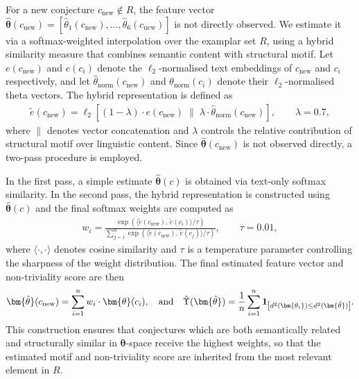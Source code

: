 \documentclass[11pt,reqno]{amsart}
\theoremstyle{plain}\newtheorem{theorem}{Theorem}[section]
\numberwithin{equation}{section}
\begin{document}
For a new conjecture $c_{\mathrm{new}}\notin R$, the feature vector $\bm{\hat{\theta}}(c_{\mathrm{new}})=[\hat{\theta}_1(c_{\mathrm{new}}),\ldots,\hat{\theta}_6(c_{\mathrm{new}})]$ is not directly observed. We estimate it via a softmax-weighted interpolation over the examplar set $R$, using a hybrid similarity measure that combines semantic content with structural motif. Let $e(c_{\mathrm{new}})$ and $e(c_i)$ denote the $\ell_2$-normalised text embeddings of $c_{\mathrm{new}}$ and $c_i$ respectively, and let $\hat{\theta}_{\text{norm}}(c_{\mathrm{new}})$ and $\theta_{\text{norm}}(c_i)$ denote their $\ell_2$-normalised theta vectors. The hybrid representation is defined as
\begin{align*}
\tilde{e}(c_{\mathrm{new}}) = \ell_2\!\left[(1-\lambda)\cdot e(c_{\mathrm{new}}) \;\Big\|\; \lambda\cdot\hat{\theta}_{\text{norm}}(c_{\mathrm{new}})\right], \qquad \lambda = 0.7,
\end{align*}
where $\|$ denotes vector concatenation and $\lambda$ controls the relative contribution of structural motif over linguistic content. Since $\bm{\hat{\theta}}(c_{\mathrm{new}})$ is not observed directly, a two-pass procedure is employed. 

In the first pass, a simple estimate $\bm{\hat{\theta}}(c)$ is obtained via text-only softmax similarity. In the second pass, the hybrid representation is constructed using $\bm{\hat{\theta}}(c)$ and the final softmax weights are computed as
\begin{align*}
w_i = \frac{\exp\!\left(\langle \tilde{e}(c_{\mathrm{new}}),\, \tilde{e}(c_i)\rangle / \tau\right)}{\sum_{j=1}^{n} \exp\!\left(\langle \tilde{e}(c_{\mathrm{new}}),\, \tilde{e}(c_j)\rangle / \tau\right)}, \qquad \tau = 0.01,
\end{align*}
where $\langle\cdot,\cdot\rangle$ denotes cosine similarity and $\tau$ is a temperature parameter controlling the sharpness of the weight distribution. The final estimated feature vector and non-triviality score are then
\begin{align}\label{thetahatdefinition}
{\bm{\hat{\theta}}}(c_{\mathrm{new}}) 
=\sum_{i=1}^{n} w_i \cdot \bm{\theta}(c_i),\quad\text{and}\quad
\Hat{\Upsilon}(\bm{\hat{\theta}})
=\frac{1}{n}\sum_{i=1}^{n}{\bf{1}}_{\left[d^2(\bm{\theta_i})\leq d^2({\bm{\Hat{\theta}}})\right]}.
\end{align}
This construction ensures that conjectures which are both semantically related and structurally similar in $\bm{\theta}$-space receive the highest weights, so that the estimated motif and non-triviality score are inherited from the most relevant element in $R$. 
\end{document}
